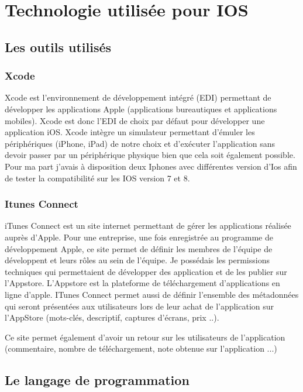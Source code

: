 \section{Technologie utilisée pour IOS}

\subsection{Les outils utilisés}

\subsubsection{Xcode}
Xcode est l’environnement de développement intégré (EDI) permettant de développer les applications Apple (applications bureautiques et applications mobiles). Xcode est donc l’EDI de choix par défaut pour développer une application iOS. Xcode intègre un simulateur permettant d’émuler les périphériques (iPhone, iPad) de notre choix et d’exécuter l’application sans devoir passer par un périphérique physique bien que cela soit également possible. Pour ma part j'avais à disposition deux Iphones avec différentes version d'Ios afin de tester la compatibilité sur les IOS version 7 et 8. 

\subsubsection{Itunes Connect}
iTunes Connect est un site internet permettant de gérer les applications réalisée auprès d’Apple. Pour une entreprise, une fois enregistrée au programme de développement Apple, ce site permet de définir les membres de l’équipe de développent et leurs rôles au sein de l’équipe. Je possédais les permissions techniques qui permettaient de développer des application et de les publier sur l’Appstore. L'Appstore est la plateforme de téléchargement d'applications en ligne d'apple. ITunes Connect permet aussi de définir l’ensemble des métadonnées qui seront présentées aux utilisateurs lors de leur achat de l’application sur l’AppStore (mots-clés, descriptif, captures d’écrans, prix ..).

Ce site permet également d'avoir un retour sur les utilisateurs de l'application (commentaire, nombre de téléchargement, note obtenue sur l'application ...)


\subsection{Le langage de programmation}

